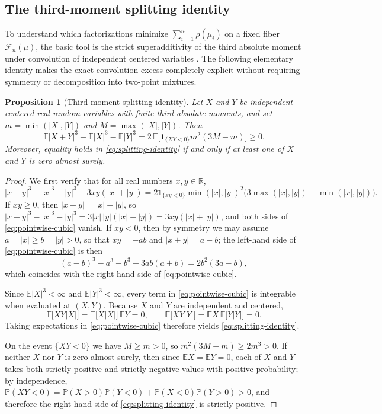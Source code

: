 \documentclass[11pt]{article}
\numberwithin{equation}{section}
\newtheorem{proposition}[theorem]{Proposition}
\theoremstyle{definition}
\theoremstyle{remark}
\newcommand{\E}{\mathbb E}
\newcommand{\Pp}{\mathbb P}
\newcommand{\R}{\mathbb R}
\newcommand{\ind}{\mathbf1}
\begin{document}
\subsection{The third-moment splitting identity}

To understand which factorizations minimize $\sum_{i=1}^n\rho(\mu_i)$ on a
fixed fiber $\mathcal F_n(\mu)$, the basic tool is the strict superadditivity
of the third absolute moment under convolution of independent centered
variables \citep[Theorem~(2.6)]{CoxKemperman1983,Ruzankin2014}. The following
elementary identity makes the exact convolution excess completely explicit
without requiring symmetry or decomposition into two-point mixtures.

\begin{proposition}[Third-moment splitting identity]\label{prop:splitting}
Let $X$ and $Y$ be independent centered real random variables with finite
third absolute moments, and set $m=\min(|X|,|Y|)$ and $M=\max(|X|,|Y|)$. Then
\begin{equation}\label{eq:splitting-identity}
 \E|X+Y|^3-\E|X|^3-\E|Y|^3
 =2\,\E\bigl[\ind_{\{XY<0\}}m^2(3M-m)\bigr]\ge0.
\end{equation}
Moreover, equality holds in \eqref{eq:splitting-identity} if and only if at
least one of $X$ and $Y$ is zero almost surely.
\end{proposition}

\begin{proof}
We first verify that for all real numbers $x,y\in\R$,
\begin{equation}\label{eq:pointwise-cubic}
 |x+y|^3-|x|^3-|y|^3-3xy(|x|+|y|)
 =2\ind_{\{xy<0\}}\min(|x|,|y|)^2\bigl(3\max(|x|,|y|)-\min(|x|,|y|)\bigr).
\end{equation}
If $xy\ge0$, then $|x+y|=|x|+|y|$, so
$|x+y|^3-|x|^3-|y|^3=3|x|\,|y|(|x|+|y|)=3xy(|x|+|y|)$, and both sides of
\eqref{eq:pointwise-cubic} vanish. If $xy<0$, then by symmetry we may assume
$a=|x|\ge b=|y|>0$, so that $xy=-ab$ and $|x+y|=a-b$; the left-hand side of
\eqref{eq:pointwise-cubic} is then
\[
 (a-b)^3-a^3-b^3+3ab(a+b)=2b^2(3a-b),
\]
which coincides with the right-hand side of \eqref{eq:pointwise-cubic}.

Since $\E|X|^3<\infty$ and $\E|Y|^3<\infty$, every term in
\eqref{eq:pointwise-cubic} is integrable when evaluated at $(X,Y)$. Because
$X$ and $Y$ are independent and centered,
\[
 \E\bigl[XY|X|\bigr]=\E\bigl[X|X|\bigr]\,\E Y=0,\qquad
 \E\bigl[XY|Y|\bigr]=\E X\,\E\bigl[Y|Y|\bigr]=0.
\]
Taking expectations in \eqref{eq:pointwise-cubic} therefore yields
\eqref{eq:splitting-identity}.

On the event $\{XY<0\}$ we have $M\ge m>0$, so $m^2(3M-m)\ge2m^3>0$. If
neither $X$ nor $Y$ is zero almost surely, then since $\E X=\E Y=0$, each of
$X$ and $Y$ takes both strictly positive and strictly negative values with
positive probability; by independence, $\Pp(XY<0)=\Pp(X>0)\Pp(Y<0)+\Pp(X<0)\Pp(Y>0)>0$,
and therefore the right-hand side of \eqref{eq:splitting-identity} is
strictly positive.
\end{proof}
\end{document}
